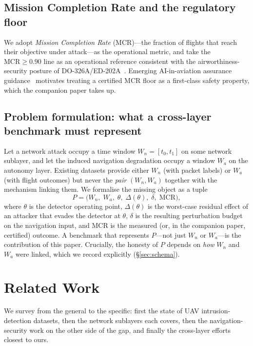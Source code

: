 \documentclass[conference]{IEEEtran}
\begin{document}
\subsection{Mission Completion Rate and the regulatory floor}
We adopt \emph{Mission Completion Rate} (MCR)---the fraction of flights that
reach their objective under attack---as the operational metric, and take the
$\text{MCR}\ge 0.90$ line as an operational reference consistent with the
airworthiness-security posture of DO-326A/ED-202A~\cite{do326a}. Emerging
AI-in-aviation assurance guidance~\cite{ed324} motivates treating a certified MCR
floor as a first-class safety property, which the companion paper takes up.

\subsection{Problem formulation: what a cross-layer benchmark must represent}
\label{sec:formulation}
Let a network attack occupy a time window $W_n=[t_0,t_1]$ on some network
sublayer, and let the induced navigation degradation occupy a window $W_a$ on
the autonomy layer. Existing datasets provide either $W_n$ (with packet labels)
or $W_a$ (with flight outcomes) but never the \emph{pair} $(W_n,W_a)$ together
with the mechanism linking them. We formalise the missing object as a tuple
\begin{equation}
\label{eq:pairing}
P = \big(W_n,\; W_a,\; \theta,\; \Delta(\theta),\; \delta,\; \text{MCR}\big),
\end{equation}
where $\theta$ is the detector operating point, $\Delta(\theta)$ is the
worst-case residual effect of an attacker that evades the detector at $\theta$,
$\delta$ is the resulting perturbation budget on the navigation input, and MCR
is the measured (or, in the companion paper, certified) outcome. A benchmark
that represents $P$---not just $W_n$ or $W_a$---is the contribution of this
paper. Crucially, the honesty of $P$ depends on \emph{how} $W_n$ and $W_a$ were
linked, which we record explicitly (\S\ref{sec:schema}).

\section{Related Work}
\label{sec:related}
We survey from the general to the specific: first the state of UAV
intrusion-detection datasets, then the network sublayers each covers, then the
navigation-security work on the other side of the gap, and finally the
cross-layer efforts closest to ours.
\end{document}
